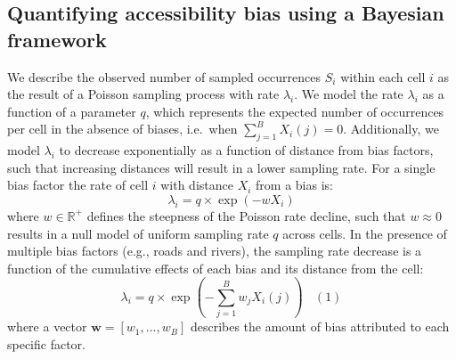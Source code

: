 \documentclass[
  12pt,
]{article}
\begin{document}
\hypertarget{quantifying-accessibility-bias-using-a-bayesian-framework}{%
\subsection{Quantifying accessibility bias using a Bayesian framework}\label{quantifying-accessibility-bias-using-a-bayesian-framework}}

We describe the observed number of sampled occurrences \(S_i\) within each cell \(i\) as the result of a Poisson sampling process with rate \(\lambda_i\). We model the rate \(\lambda_i\) as a function of a parameter \(q\), which represents the expected number of occurrences per cell in the absence of biases, i.e.~when \(\sum_{j=1}^{B}{ X_i(j)} = 0\). Additionally, we model \(\lambda_i\) to decrease exponentially as a function of distance from bias factors, such that increasing distances will result in a lower sampling rate. For a single bias factor the rate of cell \(i\) with distance \(X_i\) from a bias is:
\[
\lambda_i = q \times \exp \left(- w X_i \right)
\]
where \(w \in \mathbb{R^+}\) defines the steepness of the Poisson rate decline, such that \(w \approx 0\) results in a null model of uniform sampling rate \(q\) across cells. In the presence of multiple bias factors (e.g., roads and rivers), the sampling rate decrease is a function of the cumulative effects of each bias and its distance from the cell:
\[
\lambda_i = q \times \exp \left(-\sum_{j=1}^{B}{w_j X_i(j)} \right) \ \ \ \ (1)
\]
where a vector \(\mathbf{w} = [w_1, ..., w_B]\) describes the amount of bias attributed to each specific factor.
\end{document}
